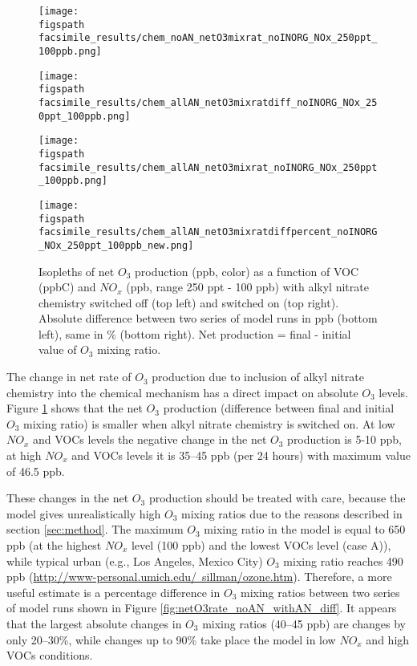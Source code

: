 \documentclass[11pt,a4paper]{article}
\newcommand{\figspath}{figures/}
\begin{document}
\begin{figure}[h] %
\centering
\begin{minipage}{.45\textwidth} %
  \centering
  \texttt{[image: \\figspath facsimile\_results/chem\_noAN\_netO3mixrat\_noINORG\_NOx\_250ppt\_100ppb.png]}
\end{minipage}
\begin{minipage}{.45\textwidth} %
  \centering
  \texttt{[image: \\figspath facsimile\_results/chem\_allAN\_netO3mixratdiff\_noINORG\_NOx\_250ppt\_100ppb.png]}
\end{minipage}
\begin{minipage}{.45\textwidth} %
  \centering
  \texttt{[image: \\figspath facsimile\_results/chem\_allAN\_netO3mixrat\_noINORG\_NOx\_250ppt\_100ppb.png]}
\end{minipage}
\begin{minipage}{.45\textwidth} %
  \centering
  \texttt{[image: \\figspath facsimile\_results/chem\_allAN\_netO3mixratdiffpercent\_noINORG\_NOx\_250ppt\_100ppb\_new.png]}
\end{minipage}
\caption{Isopleths of net $O_3$ production (ppb, color) as a function of VOC (ppbC) and $NO_x$ (ppb, range 250 ppt - 100 ppb) with alkyl nitrate chemistry switched off (top left) and switched on (top right). Absolute difference between two series of model runs in ppb (bottom left), same in \% (bottom right). Net production = final - initial value of $O_3$ mixing ratio.}
\label{fig:netO3mixrat_noAN_withAN_diff}
\end{figure}

The change in net rate of $O_3$ production due to inclusion of alkyl nitrate chemistry into the chemical mechanism has a direct impact on absolute $O_3$ levels. Figure \ref{fig:netO3mixrat_noAN_withAN_diff} shows that the net $O_3$ production (difference between final and initial $O_3$ mixing ratio) is smaller when alkyl nitrate chemistry is switched on. At low $NO_x$ and VOCs levels the negative change in the net $O_3$ production is 5-10 ppb, at high $NO_x$ and VOCs levels it is 35--45 ppb (per 24 hours) with maximum value of 46.5 ppb.

These changes in the net $O_3$ production should be treated with care, because the model gives unrealistically high $O_3$ mixing ratios due to the reasons described in section \ref{sec:method}. The maximum $O_3$ mixing ratio in the model is equal to 650 ppb (at the highest $NO_x$ level (100 ppb) and the lowest VOCs level (case A)), while typical urban (e.g., Los Angeles, Mexico City) $O_3$ mixing ratio reaches 490 ppb (\href{http://www-personal.umich.edu/~sillman/ozone.htm}{http://www-personal.umich.edu/~sillman/ozone.htm}). Therefore, a more useful estimate is a percentage difference in $O_3$ mixing ratios between two series of model runs shown in Figure \ref{fig:netO3rate_noAN_withAN_diff}. It appears that the largest absolute changes in $O_3$ mixing ratios (40--45 ppb) are changes by only 20--30\%, while changes up to 90\% take place the model in low $NO_x$ and high VOCs conditions.
\end{document}
